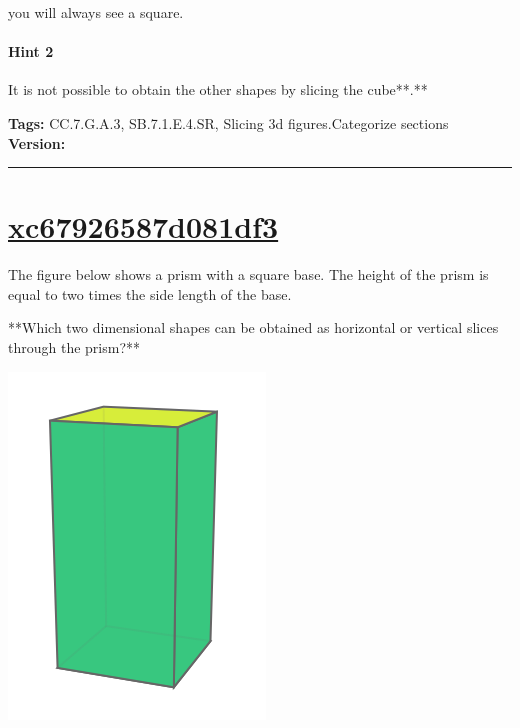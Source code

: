 \documentclass[twocolumn,10pt]{article}
\def\shrinkfactor{0.4}
\begin{document}
\DIFdelbegin {}\DIFdelend \DIFaddbegin {}\DIFaddend you will always see a square.

\paragraph{Hint 2}It is not possible to obtain the other shapes by slicing the cube**.**



\medskip
\noindent
\textbf{Tags:} {\footnotesize CC.7.G.A.3, SB.7.1.E.4.SR, Slicing 3d figures.Categorize sections}\\
\textbf{Version:} \DIFdelbegin {}\DIFdelend \DIFaddbegin {}\DIFaddend \smallskip\hrule





\section{\href{https://www.khanacademy.org/devadmin/content/items/xc67926587d081df3}{xc67926587d081df3}}

\noindent
The figure below shows a prism with a square base. The height of the prism is equal to two times the side length of the base. 

**Which two dimensional shapes can be obtained as  horizontal or vertical slices through the prism?**  


\includegraphics[scale=\shrinkfactor]{figures/eda1fc1966ba0b21e91b1ad9a6112ab7e8dc762b.png}
\end{document}

